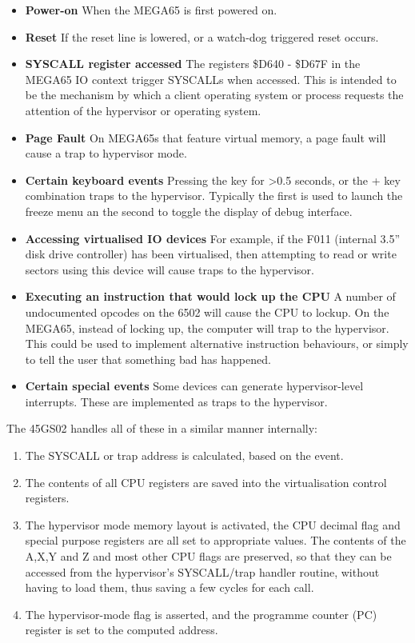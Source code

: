 \begin{itemize}
\item{\bf Power-on} When the MEGA65 is first powered on.
\item{\bf Reset} If the reset line is lowered, or a watch-dog triggered reset occurs.
\item{\bf SYSCALL register accessed} The registers \$D640 - \$D67F in the MEGA65 IO context trigger SYSCALLs when accessed.
  This is intended to be the mechanism by which a client operating system or process requests the attention of the hypervisor or operating system.
\item{\bf Page Fault} On MEGA65s that feature virtual memory, a page fault will cause a trap to hypervisor mode.
\item{\bf Certain keyboard events} Pressing the  key for >0.5 seconds, or the  +  key combination traps to the hypervisor.  Typically the first is used to launch the freeze menu an the second to toggle the display of debug interface.
\item{\bf Accessing virtualised IO devices} For example, if the F011 (internal 3.5'' disk drive controller) has been virtualised, then attempting to read or write sectors using this device will cause traps to the hypervisor.
  \item{\bf Executing an instruction that would lock up the CPU} A number of undocumented opcodes on the 6502 will cause the CPU to lockup.  On the MEGA65, instead of locking up, the computer will trap to the hypervisor.  This could be used to implement alternative instruction behaviours, or simply to tell the user that something bad has happened.
  \item{\bf Certain special events} Some devices can generate hypervisor-level interrupts. These are implemented as traps to the hypervisor.
\end{itemize}

The 45GS02 handles all of these in a similar manner internally:

\begin{enumerate}
\item The SYSCALL or trap address is calculated, based on the event.
\item The contents of all CPU registers are saved into the virtualisation control registers.
\item The hypervisor mode memory layout is activated, the CPU decimal flag and special purpose registers are all set to appropriate values.  The contents of the A,X,Y and Z and most other CPU flags are preserved, so that they can be accessed from the hypervisor's SYSCALL/trap handler routine, without having to load them, thus saving a few cycles for each call.
\item The hypervisor-mode flag is asserted, and the programme counter (PC) register is set to the computed address.
\end{enumerate}

